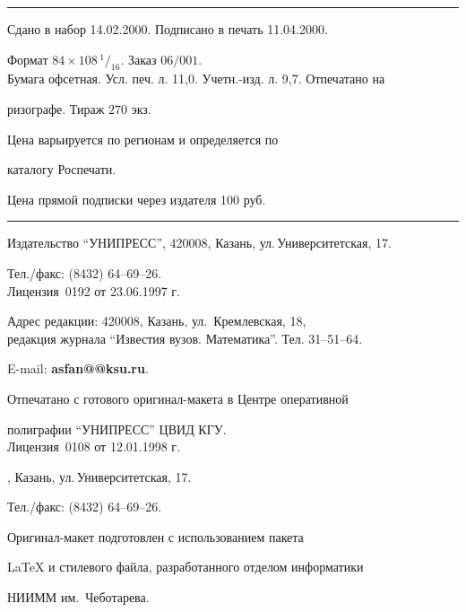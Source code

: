 \bigskip 


\hrule 


\setlength{\hoffset}{-23mm}


\bigskip


\noindent Сдано в набор 14.02.2000. Подписано в печать 11.04.2000.


Формат $84\times 108 \,^1/_{16}.$ Заказ $06/001$.\\


Бумага офсетная. Усл. печ. л. 11,0. Учетн.-изд. л. 9,7. Отпечатано на 


ризографе. Тираж $270$ экз. 





\noindent Цена варьируется по регионам и определяется по 


каталогу Роспечати. 





\noindent Цена прямой подписки через издателя 100 руб. 


\bigskip


\hrule


\bigskip


\noindent Издательство ``УНИПРЕСС'', 420008, Казань, ул.\,Университетская, 17.


Тел./факс: (8432) 64--69--26.\\


Лицензия \No\,0192 от 23.06.1997 г.


\smallskip





\noindent Адрес редакции: 420008, Казань, ул.~Кремлевская, 18,\\  


редакция журнала  ``Известия вузов. Математика''. Тел. 31--51--64.





\noindent E-mail: {\bf asfan@@ksu.ru}. \par


\bigskip 


\noindent Отпечатано с готового оригинал-макета в Центре оперативной


полиграфии ``УНИПРЕСС'' ЦВИД КГУ. \\


Лицензия \No\,0108 от 12.01.1998 г.





, Казань, ул.\,Университетская, 17.


Тел./факс: (8432) 64--69--26. \par


\bigskip


\noindent Оригинал-макет подготовлен с использованием пакета


\AmS\LaTeX{} и стилевого файла, разработанного отделом информатики


НИИММ им.~Чеботарева.








